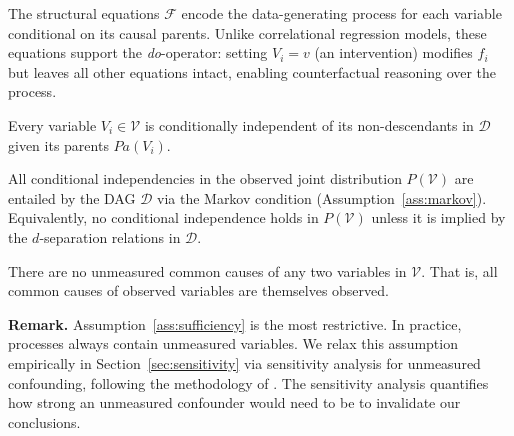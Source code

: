 \noindent The structural equations $\mathcal{F}$ encode the data-generating
process for each variable conditional on its causal parents. Unlike correlational
regression models, these equations support the \emph{do}-operator: setting
$V_i = v$ (an intervention) modifies $f_i$ but leaves all other equations intact,
enabling counterfactual reasoning over the process.

\begin{assumption}
\label{ass:markov}
Every variable $V_i \in \mathcal{V}$ is conditionally independent of its
non-descendants in $\mathcal{D}$ given its parents $\mathit{Pa}(V_i)$.
\end{assumption}

\begin{assumption}[Faithfulness]
\label{ass:faithfulness}
All conditional independencies in the observed joint distribution
$P(\mathcal{V})$ are entailed by the DAG $\mathcal{D}$ via the Markov
condition (Assumption~\ref{ass:markov}). Equivalently, no conditional
independence holds in $P(\mathcal{V})$ unless it is implied by the
$d$-separation relations in $\mathcal{D}$.
\end{assumption}

\begin{assumption}
\label{ass:sufficiency}
There are no unmeasured common causes of any two variables in $\mathcal{V}$.
That is, all common causes of observed variables are themselves observed.
\end{assumption}

\noindent \textbf{Remark.} Assumption~\ref{ass:sufficiency} is the most
restrictive. In practice, processes always contain unmeasured variables.
We relax this assumption empirically in Section~\ref{sec:sensitivity} via
sensitivity analysis for unmeasured confounding, following the methodology
of \citet{cinelli2020making}. The sensitivity analysis quantifies how strong
an unmeasured confounder would need to be to invalidate our conclusions.

